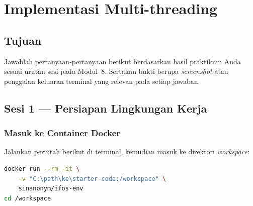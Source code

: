 
\chapter{Implementasi Multi-threading}
\label{chap:handson-04}

\section{Tujuan}

Jawablah pertanyaan-pertanyaan berikut berdasarkan hasil praktikum Anda
sesuai urutan sesi pada Modul~8.
Sertakan bukti berupa \textit{screenshot} atau penggalan keluaran
terminal yang relevan pada setiap jawaban.

\section{Sesi 1 --- Persiapan Lingkungan Kerja}

\subsection{Masuk ke Container Docker}

Jalankan perintah berikut di terminal, kemudian masuk ke direktori
\textit{workspace}:

\begin{lstlisting}[language=bash, caption={Menjalankan container dan masuk workspace}]
docker run --rm -it \
    -v "C:\path\ke\starter-code:/workspace" \
    sinanonym/ifos-env
cd /workspace
\end{lstlisting}


